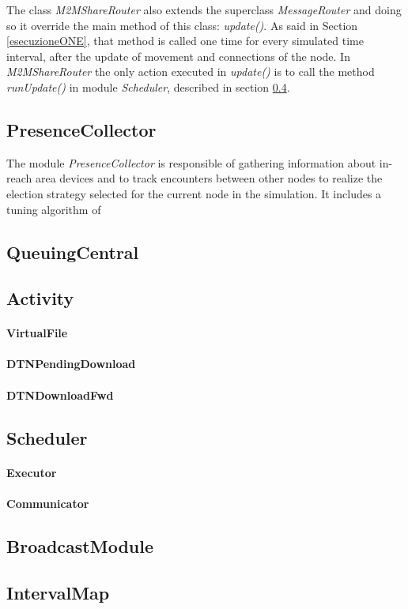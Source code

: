 The class \textit{M2MShareRouter} also extends the superclass \textit{MessageRouter} and doing so it override the main method of this class: \textit{update()}. As said in Section \ref{esecuzioneONE}, that method is called one time for every simulated time interval, after the update of movement and connections of the node. In \textit{M2MShareRouter} the only action executed in \textit{update()} is to call the method \textit{runUpdate()} in module \textit{Scheduler}, described in section \ref{schedulerImplementazione}.

\subsection{PresenceCollector}
The module \textit{PresenceCollector} is responsible of gathering information about in-reach area devices and to track encounters between other nodes to realize the election strategy selected for the current node in the simulation. It includes a tuning algorithm of

\subsection{QueuingCentral}

\subsection{Activity}
\paragraph{VirtualFile}
\paragraph{DTNPendingDownload}
\paragraph{DTNDownloadFwd}

\subsection{Scheduler}
\label{schedulerImplementazione}
\paragraph{Executor}
\paragraph{Communicator}

\subsection{BroadcastModule}

\subsection{IntervalMap}
 


